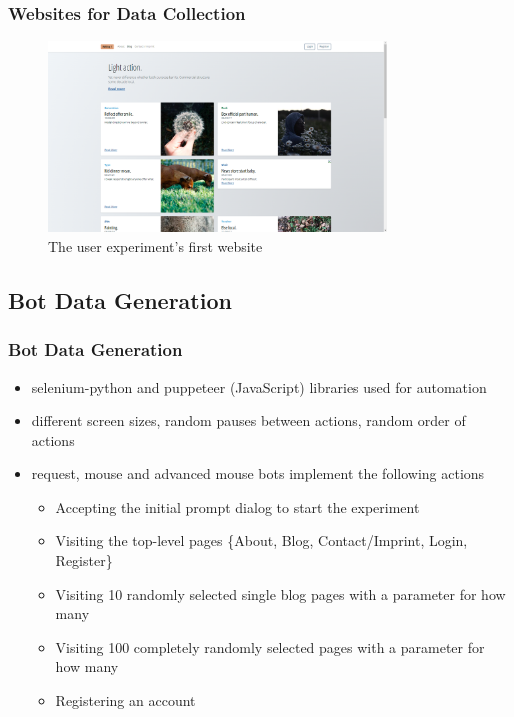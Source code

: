 \documentclass[t,aspectratio=169,table]{beamer}
\begin{document}
\begin{frame}
\frametitle{Websites for Data Collection}
\begin{centering}
\begin{figure}
    \includegraphics[width=0.8\textwidth]{screenshots/fmexp1_169.png}
    \caption{The user experiment's first website}
    \label{screenshot:fmexp1}
\end{figure}
\end{centering}
\end{frame}


\subsection{Bot Data Generation}
\begin{frame}
\frametitle{Bot Data Generation}

\begin{itemize}
    \item selenium-python and puppeteer (JavaScript) libraries used for automation
    \item different screen sizes, random pauses between actions, random order of actions
    \item request, mouse and advanced mouse bots implement the following actions
    \begin{itemize}
        \item Accepting the initial prompt dialog to start the experiment
        \item Visiting the top-level pages \{About, Blog, Contact/Imprint, Login, Register\}
        \item Visiting 10 randomly selected single blog pages with a parameter for how many
        \item Visiting 100 completely randomly selected pages with a parameter for how many
        \item Registering an account
    \end{itemize}
\end{itemize}

\end{frame}
\end{document}
